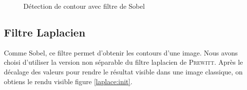 \documentclass{article}
\begin{document}
\begin{figure}[!ht]%
  \centering
  \hspace{0.030\textwidth}
  \caption{Détection de contour avec filtre de Sobel}
  \label{sobelc:init}
\end{figure}

\subsection{Filtre Laplacien}

Comme Sobel, ce filtre permet d'obtenir les contours d'une image. Nous avons choisi d'utiliser la version non séparable
du filtre laplacien de
\textsc{Prewitt}. Après le décalage des valeurs pour rendre le résultat visible dans une image classique, on obtiens le
rendu visible figure \ref{laplace:init}.
\end{document}
